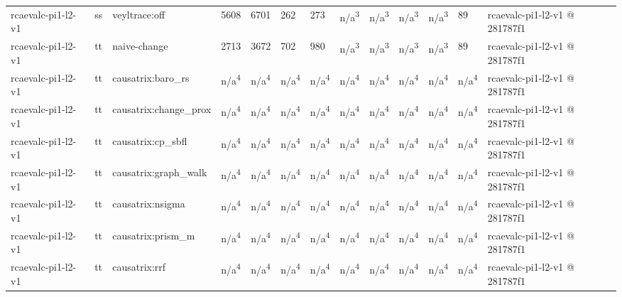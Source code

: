 \begin{table}[t]
\begin{tabular}{lllllllllllll}
rcaevalc-pi1-l2-v1 & ss & veyltrace:off & 5608 & 6701 & 262 & 273 & n/a\textsuperscript{3} & n/a\textsuperscript{3} & n/a\textsuperscript{3} & n/a\textsuperscript{3} & 89 & rcaevalc-pi1-l2-v1 @ 281787f1 \\
rcaevalc-pi1-l2-v1 & tt & naive-change & 2713 & 3672 & 702 & 980 & n/a\textsuperscript{3} & n/a\textsuperscript{3} & n/a\textsuperscript{3} & n/a\textsuperscript{3} & 89 & rcaevalc-pi1-l2-v1 @ 281787f1 \\
rcaevalc-pi1-l2-v1 & tt & causatrix:baro\_rs & n/a\textsuperscript{4} & n/a\textsuperscript{4} & n/a\textsuperscript{4} & n/a\textsuperscript{4} & n/a\textsuperscript{4} & n/a\textsuperscript{4} & n/a\textsuperscript{4} & n/a\textsuperscript{4} & n/a\textsuperscript{4} & rcaevalc-pi1-l2-v1 @ 281787f1 \\
rcaevalc-pi1-l2-v1 & tt & causatrix:change\_prox & n/a\textsuperscript{4} & n/a\textsuperscript{4} & n/a\textsuperscript{4} & n/a\textsuperscript{4} & n/a\textsuperscript{4} & n/a\textsuperscript{4} & n/a\textsuperscript{4} & n/a\textsuperscript{4} & n/a\textsuperscript{4} & rcaevalc-pi1-l2-v1 @ 281787f1 \\
rcaevalc-pi1-l2-v1 & tt & causatrix:cp\_sbfl & n/a\textsuperscript{4} & n/a\textsuperscript{4} & n/a\textsuperscript{4} & n/a\textsuperscript{4} & n/a\textsuperscript{4} & n/a\textsuperscript{4} & n/a\textsuperscript{4} & n/a\textsuperscript{4} & n/a\textsuperscript{4} & rcaevalc-pi1-l2-v1 @ 281787f1 \\
rcaevalc-pi1-l2-v1 & tt & causatrix:graph\_walk & n/a\textsuperscript{4} & n/a\textsuperscript{4} & n/a\textsuperscript{4} & n/a\textsuperscript{4} & n/a\textsuperscript{4} & n/a\textsuperscript{4} & n/a\textsuperscript{4} & n/a\textsuperscript{4} & n/a\textsuperscript{4} & rcaevalc-pi1-l2-v1 @ 281787f1 \\
rcaevalc-pi1-l2-v1 & tt & causatrix:nsigma & n/a\textsuperscript{4} & n/a\textsuperscript{4} & n/a\textsuperscript{4} & n/a\textsuperscript{4} & n/a\textsuperscript{4} & n/a\textsuperscript{4} & n/a\textsuperscript{4} & n/a\textsuperscript{4} & n/a\textsuperscript{4} & rcaevalc-pi1-l2-v1 @ 281787f1 \\
rcaevalc-pi1-l2-v1 & tt & causatrix:prism\_m & n/a\textsuperscript{4} & n/a\textsuperscript{4} & n/a\textsuperscript{4} & n/a\textsuperscript{4} & n/a\textsuperscript{4} & n/a\textsuperscript{4} & n/a\textsuperscript{4} & n/a\textsuperscript{4} & n/a\textsuperscript{4} & rcaevalc-pi1-l2-v1 @ 281787f1 \\
rcaevalc-pi1-l2-v1 & tt & causatrix:rrf & n/a\textsuperscript{4} & n/a\textsuperscript{4} & n/a\textsuperscript{4} & n/a\textsuperscript{4} & n/a\textsuperscript{4} & n/a\textsuperscript{4} & n/a\textsuperscript{4} & n/a\textsuperscript{4} & n/a\textsuperscript{4} & rcaevalc-pi1-l2-v1 @ 281787f1 \\

\end{tabular}
\end{table}
